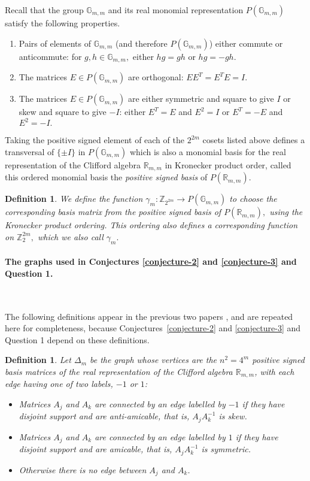 \documentclass[12pt,a4paper]{article}
\newcommand{\mb}[1]{\mathbb{#1}}
\newcommand{\G}{\mb{G}}
\newcommand{\R}{\mb{R}}
\newcommand{\Z}{\mb{Z}}
\newcommand{\Rep}{P}
\newcommand{\To}{\rightarrow}
\newtheorem*{definition}{Definition}
\newtheorem{Definition}{Definition}
\begin{document}
Recall that
the group $\G_{m,m}$ and its real monomial representation $\Rep(\G_{m,m})$ 
satisfy the following properties.
\begin{enumerate}
\item 
Pairs of elements of $\G_{m,m}$ (and therefore $\Rep(\G_{m,m})$) either commute or anti\-commute:
for $g, h \in \G_{m,m},$ either $h g = g h$ or $h g = - g h.$
\item
The matrices $E \in \Rep(\G_{m,m})$ are orthogonal: $E E^T = E^T E = I.$
\item
The matrices $E \in \Rep(\G_{m,m})$ are either symmetric and square to give $I$ or 
skew and square to give $-I$: either $E^T = E$ and $E^2 =I$ or $E^T = -E$ and $E^2 = -I.$
\end{enumerate}

Taking the positive signed element of each of the $2^{2m}$ cosets listed above
defines a transversal of $\{\pm I\}$ in $\Rep(\G_{m,m})$
which is also a monomial basis for the real representation of the Clifford algebra $\R_{m,m}$ in 
Kronecker product order,
called this ordered monomial basis the \emph{positive signed basis} of $\Rep(\R_{m,m}).$ 

\begin{definition}\label{definition-gamma}
We define the function $\gamma_m : \Z_{2^{2 m}} \To \Rep(\G_{m,m})$ 
to choose the corresponding basis matrix from the positive signed basis of $\Rep(\R_{m,m}),$
using the Kronecker product ordering.
This ordering also defines a corresponding function on $\Z_2^{2 m},$
which we also call $\gamma_m.$
\end{definition}

\paragraph*{The graphs used in Conjectures \ref{conjecture-2} and \ref{conjecture-3} and Question 1.}
\label{sec-Graphs}

~

The following definitions appear in the previous two papers \cite{Leo14Constructions,Leo15Bent},
and are repeated here for completeness, because Conjectures~\ref{conjecture-2} and \ref{conjecture-3} and Question 1 depend on these definitions.

\begin{Definition}\label{definition-delta}
Let $\varDelta_m$ be the graph whose vertices are the $n^2=4^m$ 
positive signed basis matrices of the real representation
of the Clifford algebra $\R_{m,m}$,
with each edge having one of two labels, $-1$ or $1$:
\begin{itemize}
\item 
Matrices $A_j$ and $A_k$ are connected by an edge labelled by $-1$ if they have disjoint support and are anti-amicable,
that is, $A_j A_k^{-1}$ is skew.
\item 
Matrices $A_j$ and $A_k$ are connected by an edge labelled by $1$ if they have disjoint support and are amicable,
that is, $A_j A_k^{-1}$ is symmetric.
\item 
Otherwise there is no edge between $A_j$ and $A_k$.
\end{itemize}
\end{Definition}
\end{document}

